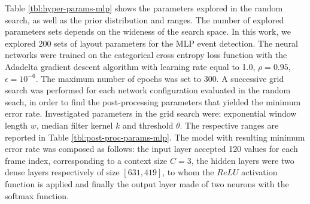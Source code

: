 \documentclass{article}
\begin{document}
\begin{sloppy}

Table \ref{tbl:hyper-params-mlp} shows the parameters explored in the random search, as well as the prior distribution and ranges. The
number of explored parameters sets depends on the wideness of the search space. In this work, we explored 200 sets of layout parameters for the MLP event detection. The neural networks were trained on the categorical cross entropy loss function with the Adadelta gradient descent algorithm with learning rate equal to 1.0, $\rho=0.95$, $\epsilon=10^{-6}$. The maximum number of epochs was set to 300. A successive grid search was performed for each network configuration evaluated in the random seach, in order to find the post-processing parameters that yielded the minimum error rate. Investigated parameters in the grid search were: exponential window length $w$, median filter kernel $k$ and threshold $\theta$. The respective ranges are reported in Table \ref{tbl:post-proc-params-mlp}. The model with resulting minimum error rate was composed as follows: the input layer accepted 120 values for each frame index, corresponding to a context size $C=3$, the hidden layers were two dense layers respectively of size $[631,419]$, to whom the $ReLU$ activation function is applied and finally the output layer made of two neurons with the softmax function.


\end{sloppy}
\end{document}

